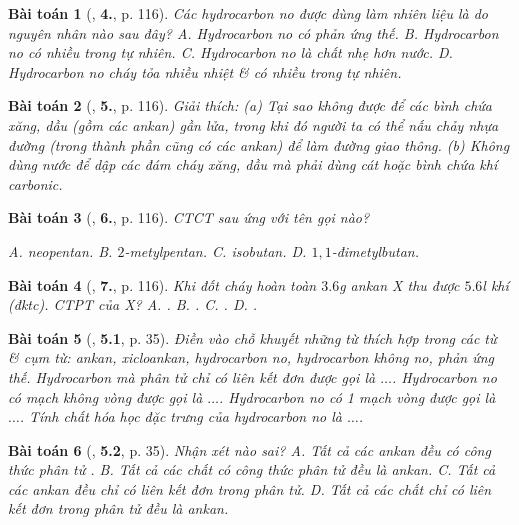 \documentclass{article}
\numberwithin{equation}{section}
\newtheorem{baitoan}{Bài toán}[section]
\begin{document}
\begin{baitoan}[\cite{SGK_Hoa_Hoc_11_co_ban}, \textbf{4.}, p. 116]
	Các hydrocarbon no được dùng làm nhiên liệu là do nguyên nhân nào sau đây? {\sf A.} Hydrocarbon no có phản ứng thế. {\sf B.} Hydrocarbon no có nhiều trong tự nhiên. {\sf C.} Hydrocarbon no là chất nhẹ hơn nước. {\sf D.} Hydrocarbon no cháy tỏa nhiều nhiệt \& có nhiều trong tự nhiên. 
\end{baitoan}

\begin{baitoan}[\cite{SGK_Hoa_Hoc_11_co_ban}, \textbf{5.}, p. 116]
	Giải thích: (a) Tại sao không được để các bình chứa xăng, dầu (gồm các ankan) gần lửa, trong khi đó người ta có thể nấu chảy nhựa đường (trong thành phần cũng có các ankan) để làm đường giao thông. (b) Không dùng nước để dập các đám cháy xăng, dầu mà phải dùng cát hoặc bình chứa khí carbonic.
\end{baitoan}

\begin{baitoan}[\cite{SGK_Hoa_Hoc_11_co_ban}, \textbf{6.}, p. 116]
	CTCT sau ứng với tên gọi nào?
	\begin{center}
	\end{center}
	{\sf A.} neopentan. {\sf B.} $2$-metylpentan. {\sf C.} isobutan. {\sf D.} $1,1$-đimetylbutan.
\end{baitoan}

\begin{baitoan}[\cite{SGK_Hoa_Hoc_11_co_ban}, \textbf{7.}, p. 116]
	Khi đốt cháy hoàn toàn $3.6$\emph{g} ankan X thu được $5.6$\emph{l} khí \emph{} (đktc). CTPT của X? {\sf A.} \emph{}. {\sf B.} \emph{}. {\sf C.} \emph{}. {\sf D.} \emph{}. 
\end{baitoan}

\begin{baitoan}[\cite{SBT_Hoa_Hoc_11_co_ban}, \textbf{5.1}, p. 35]
	Điền vào chỗ khuyết những từ thích hợp trong các từ \& cụm từ: \emph{ankan, xicloankan, hydrocarbon no, hydrocarbon không no, phản ứng thế}. Hydrocarbon mà phân tử chỉ có liên kết đơn được gọi là $\ldots$. Hydrocarbon no có mạch không vòng được gọi là $\ldots$. Hydrocarbon no có 1 mạch vòng được gọi là $\ldots$. Tính chất hóa học đặc trưng của hydrocarbon no là $\ldots$.
\end{baitoan}

\begin{baitoan}[\cite{SBT_Hoa_Hoc_11_co_ban}, \textbf{5.2}, p. 35]
	Nhận xét nào sai? {\sf A.} Tất cả các ankan đều có công thức phân tử \emph{}. {\sf B.} Tất cả các chất có công thức phân tử \emph{} đều là ankan. {\sf C.} Tất cả các ankan đều chỉ có liên kết đơn trong phân tử. {\sf D.} Tất cả các chất chỉ có liên kết đơn trong phân tử đều là ankan.
\end{baitoan}
\end{document}
